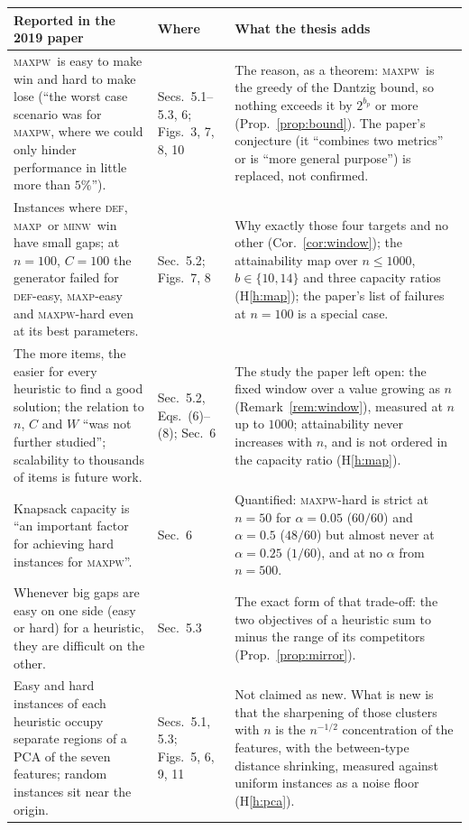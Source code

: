 \documentclass[a4paper,11pt]{article}
\newcommand{\bp}{b_{p}}
\newcommand{\DEF}{\textsc{def}}
\newcommand{\MAXP}{\textsc{maxp}}
\newcommand{\MAXPW}{\textsc{maxpw}}
\newcommand{\MINW}{\textsc{minw}}
\theoremstyle{plain}
\theoremstyle{definition}
\theoremstyle{remark}
\begin{document}
\begin{center}\scriptsize
\begin{longtable}{@{}p{5.3cm}p{1.5cm}p{7.6cm}@{}}
\toprule
Reported in the 2019 paper & Where & What the thesis adds \\
\midrule
\endhead
\MAXPW\ is easy to make win and hard to make lose (``the worst case scenario was for
\MAXPW, where we could only hinder performance in little more than $5\%$''). & Secs.~5.1--5.3, 6; Figs.~3, 7, 8, 10 & The reason, as a theorem: \MAXPW\ is the greedy of the Dantzig bound, so nothing exceeds it by $2^{\bp}$ or more (Prop.~\ref{prop:bound}). The paper's conjecture (it ``combines two metrics'' or is ``more general purpose'') is replaced, not confirmed. \\
Instances where \DEF, \MAXP\ or \MINW\ win have small gaps; at $n=100$, $C=100$ the generator failed for \DEF-easy, \MAXP-easy and \MAXPW-hard even at its best parameters. & Sec.~5.2; Figs.~7, 8 & Why exactly those four targets and no other (Cor.~\ref{cor:window}); the attainability map over $n\le1000$, $b\in\{10,14\}$ and three capacity ratios (H\ref{h:map}); the paper's list of failures at $n=100$ is a special case. \\
The more items, the easier for every heuristic to find a good solution; the relation to $n$, $C$ and $W$ ``was not further studied''; scalability to thousands of items is future work. & Sec.~5.2, Eqs.~(6)--(8); Sec.~6 & The study the paper left open: the fixed window over a value growing as $n$ (Remark~\ref{rem:window}), measured at $n$ up to $1000$; attainability never increases with $n$, and is not ordered in the capacity ratio (H\ref{h:map}). \\
Knapsack capacity is ``an important factor for achieving hard instances for \MAXPW''. & Sec.~6 & Quantified: \MAXPW-hard is strict at $n=50$ for $\alpha=0.05$ ($60/60$) and $\alpha=0.5$ ($48/60$) but almost never at $\alpha=0.25$ ($1/60$), and at no $\alpha$ from $n=500$. \\
Whenever big gaps are easy on one side (easy or hard) for a heuristic, they are difficult on the other. & Sec.~5.3 & The exact form of that trade-off: the two objectives of a heuristic sum to minus the range of its competitors (Prop.~\ref{prop:mirror}). \\
Easy and hard instances of each heuristic occupy separate regions of a PCA of the seven features; random instances sit near the origin. & Secs.~5.1, 5.3; Figs.~5, 6, 9, 11 & Not claimed as new. What is new is that the sharpening of those clusters with $n$ is the $n^{-1/2}$ concentration of the features, with the between-type distance shrinking, measured against uniform instances as a noise floor (H\ref{h:pca}). \\

\end{longtable}
\end{center}
\end{document}
